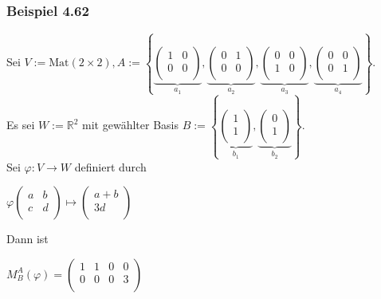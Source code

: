\documentclass{article}
\begin{document}
\subsubsection*{Beispiel 4.62}
Sei $V := \text{Mat}(2 \times 2), A := \left\{\underbrace{\begin{pmatrix}
    1 & 0 \\
    0 & 0 \\
\end{pmatrix}}_{a_1}, \underbrace{\begin{pmatrix}
    0 & 1 \\
    0 & 0 \\
\end{pmatrix}}_{a_2}, \underbrace{\begin{pmatrix}
    0 & 0 \\
    1 & 0 \\
\end{pmatrix}}_{a_3}, \underbrace{\begin{pmatrix}
    0 & 0 \\
    0 & 1 \\
\end{pmatrix}}_{a_4}\right\}$.\\
Es sei $W := \mathbb{R}^2$ mit gewählter Basis $B := \left\{\underbrace{\begin{pmatrix}
    1 \\
    1 \\
\end{pmatrix}}_{b_1}, \underbrace{\begin{pmatrix}
    0 \\
    1 \\
    \end{pmatrix}}_{b_2}\right\}$. \\
Sei $\varphi: V \rightarrow W$ definiert durch \\
\begin{center}
    $\varphi \begin{pmatrix}
        a & b \\
        c & d \\
    \end{pmatrix} \mapsto \begin{pmatrix}
        a + b \\
        3d \\
    \end{pmatrix}$ \\
\end{center}
Dann ist \\
\begin{center}
$M_B^{A}(\varphi) = \begin{pmatrix}
    1 & 1 & 0 & 0 \\
    0 & 0 & 0 & 3 \\
\end{pmatrix}$ \\
\end{center}
\end{document}
